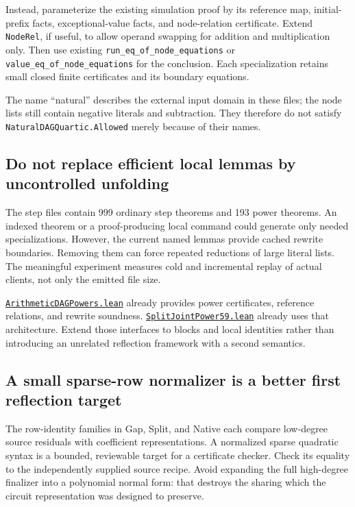 \documentclass[11pt,letterpaper]{article}
\newcommand{\code}[1]{\nolinkurl{#1}}
\newcommand{\src}[2]{\href{https://github.com/VladimirReshetnikov/ProveIt/blob/60e9c5d620c6c387d932876cfa2d9376f64ea56c/Computability/DiophantineConsistency/Lean/DiophantineConsistency/#1.lean}{\code{#1.lean}}#2}
\begin{document}
Instead, parameterize the existing simulation proof by its reference map,
initial-prefix facts, exceptional-value facts, and node-relation certificate.
Extend \code{NodeRel}, if useful, to allow operand swapping for addition and
multiplication only. Then use existing \code{run_eq_of_node_equations} or
\code{value_eq_of_node_equations} for the conclusion. Each specialization
retains small closed finite certificates and its boundary equations.

The name ``natural'' describes the external input domain in these files;
the node lists still contain negative literals and subtraction. They therefore
do not satisfy \code{NaturalDAGQuartic.Allowed} merely because of their names.

\subsection{Do not replace efficient local lemmas by uncontrolled unfolding}

The step files contain 999 ordinary step theorems and 193 power theorems.
An indexed theorem or a proof-producing local command could generate only
needed specializations. However, the current named lemmas provide cached
rewrite boundaries. Removing them can force repeated reductions of large
literal lists. The meaningful experiment measures cold and incremental replay
of actual clients, not only the emitted file size.

\src{ArithmeticDAGPowers}{ already provides power certificates, reference
relations, and rewrite soundness.}
\src{SplitJointPower59}{ already uses that architecture.}
Extend those interfaces to blocks and local identities rather than introducing
an unrelated reflection framework with a second semantics.

\subsection{A small sparse-row normalizer is a better first reflection target}

The row-identity families in Gap, Split, and Native each compare low-degree
source residuals with coefficient representations. A normalized sparse
quadratic syntax is a bounded, reviewable target for a certificate checker.
Check its equality to the independently supplied source recipe. Avoid expanding
the full high-degree finalizer into a polynomial normal form: that destroys
the sharing which the circuit representation was designed to preserve.
\end{document}
